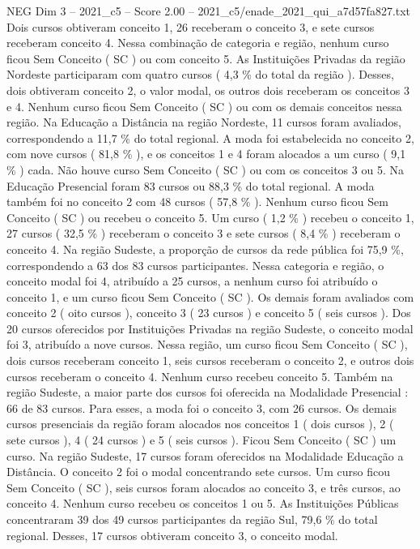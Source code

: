 \begin{textsample}{NEG Dim 3 – 2021\_c5 – Score 2.00 – 2021\_c5/enade\_2021\_qui\_a7d57fa827.txt}
Dois cursos obtiveram conceito 1, 26 receberam o conceito 3, e sete cursos receberam conceito 4.
Nessa combinação de categoria e região, nenhum curso ficou Sem Conceito ( SC ) ou com conceito 5.
As Instituições Privadas da região Nordeste participaram com quatro cursos ( 4,3 \% do total da região ).
Desses, dois obtiveram conceito 2, o valor modal, os outros dois receberam os conceitos 3 e 4.
Nenhum curso ficou Sem Conceito ( SC ) ou com os demais conceitos nessa região.
Na Educação a Distância na região Nordeste, 11 cursos foram avaliados, correspondendo a 11,7 \% do total regional.
A moda foi estabelecida no conceito 2, com nove cursos ( 81,8 \% ), e os conceitos 1 e 4 foram alocados a um curso ( 9,1 \% ) cada.
Não houve curso Sem Conceito ( SC ) ou com os conceitos 3 ou 5.
Na Educação Presencial foram 83 cursos ou 88,3 \% do total regional.
A moda também foi no conceito 2 com 48 cursos ( 57,8 \% ).
Nenhum curso ficou Sem Conceito ( SC ) ou recebeu o conceito 5.
Um curso ( 1,2 \% ) recebeu o conceito 1, 27 cursos ( 32,5 \% ) receberam o conceito 3 e sete cursos ( 8,4 \% ) receberam o conceito 4.
Na região Sudeste, a proporção de cursos da rede pública foi 75,9 \%, correspondendo a 63 dos 83 cursos participantes.
Nessa categoria e região, o conceito modal foi 4, atribuído a 25 cursos, a nenhum curso foi atribuído o conceito 1, e um curso ficou Sem Conceito ( SC ).
Os demais foram avaliados com conceito 2 ( oito cursos ), conceito 3 ( 23 cursos ) e conceito 5 ( seis cursos ).
Dos 20 cursos oferecidos por Instituições Privadas na região Sudeste, o conceito modal foi 3, atribuído a nove cursos.
Nessa região, um curso ficou Sem Conceito ( SC ), dois cursos receberam conceito 1, seis cursos receberam o conceito 2, e outros dois cursos receberam o conceito 4.
Nenhum curso recebeu conceito 5.
Também na região Sudeste, a maior parte dos cursos foi oferecida na Modalidade Presencial : 66 de 83 cursos.
Para esses, a moda foi o conceito 3, com 26 cursos.
Os demais cursos presenciais da região foram alocados nos conceitos 1 ( dois cursos ), 2 ( sete cursos ), 4 ( 24 cursos ) e 5 ( seis cursos ).
Ficou Sem Conceito ( SC ) um curso.
Na região Sudeste, 17 cursos foram oferecidos na Modalidade Educação a Distância.
O conceito 2 foi o modal concentrando sete cursos.
Um curso ficou Sem Conceito ( SC ), seis cursos foram alocados ao conceito 3, e três cursos, ao conceito 4.
Nenhum curso recebeu os conceitos 1 ou 5.
As Instituições Públicas concentraram 39 dos 49 cursos participantes da região Sul, 79,6 \% do total regional.
Desses, 17 cursos obtiveram conceito 3, o conceito modal.

\end{textsample}
